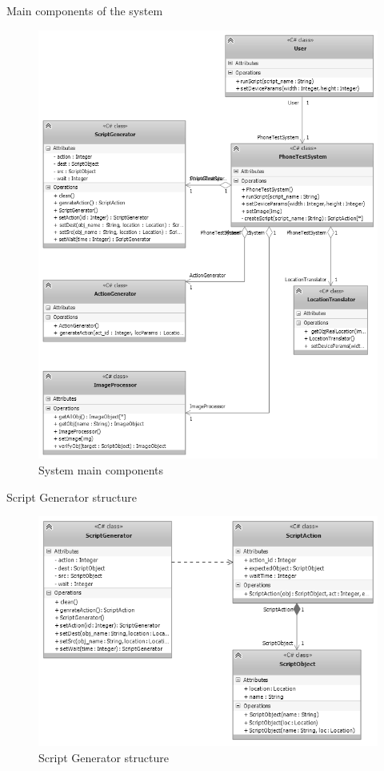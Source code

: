 Main components of the system
	\begin{figure}[H]
		\centering
		\includegraphics[scale=0.75]{Chapters/Fig/main_class.png}
		\caption{System main components}
		\label{fig:main_class}
	\end{figure}

Script Generator structure
	\begin{figure}[H]
		\centering
		\includegraphics[scale=0.75]{Chapters/Fig/script_gen.png}
		\caption{Script Generator structure}
		\label{fig:script_gen}
	\end{figure}

